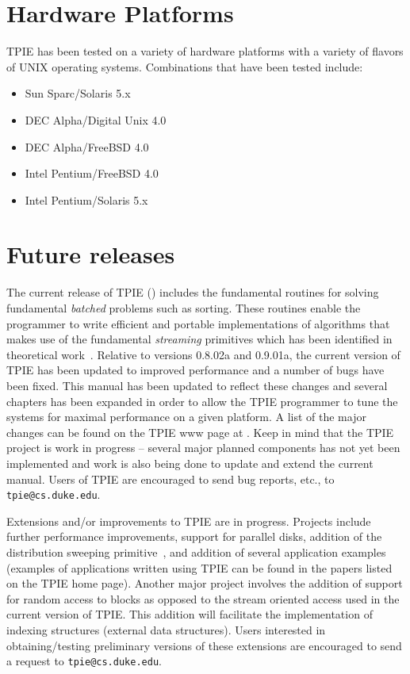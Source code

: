 \section{Hardware Platforms}

TPIE has been tested on a variety of hardware platforms with a variety of
flavors of UNIX operating systems. Combinations that have been tested
include:
\begin{itemize}
\item Sun Sparc/Solaris 5.x
\item DEC Alpha/Digital Unix 4.0
\item DEC Alpha/FreeBSD 4.0
\item Intel Pentium/FreeBSD 4.0
\item Intel Pentium/Solaris 5.x
\end{itemize}


\section{Future releases}

The current release of TPIE (\version) includes the fundamental routines for
solving fundamental {\em batched} problems such as sorting. These routines
enable the programmer to write efficient and portable implementations of
algorithms that makes use of the fundamental {\em streaming} primitives
which has been identified in theoretical
work~\cite{arge:gisbook,vitter:podssurvey}. Relative to
versions 0.8.02a and 0.9.01a, the
current version of TPIE has been updated to improved performance and a
number of bugs have been fixed. This manual has been updated to reflect
these changes and several chapters has been expanded in order to allow the
TPIE programmer to tune the systems for maximal performance on a given
platform. A list of the major changes can be found on the TPIE www page at
. Keep in mind that the TPIE project is
work in progress -- several major planned components has not yet been
implemented and work is also being done to update and extend the current
manual. Users of TPIE are encouraged to send bug reports, etc., to
\verb|tpie@cs.duke.edu|.

Extensions and/or improvements to TPIE are in
progress. Projects include further performance improvements, support for
parallel disks, addition of the distribution sweeping
primitive~\cite{goodrich:external}, and addition of several application
examples (examples of applications written using TPIE can be found in the
papers listed on the TPIE home page). Another major project involves the
addition of support for random access to blocks as opposed to the stream
oriented access used in the current version of TPIE. This addition will
facilitate the implementation of indexing structures (external data
structures). Users interested in obtaining/testing preliminary versions of
these extensions are encouraged to send a request to
\verb|tpie@cs.duke.edu|.


